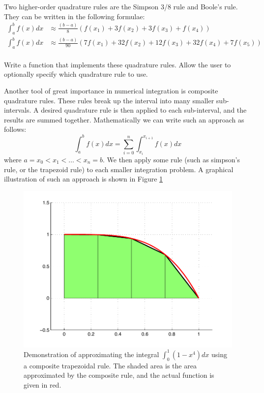 \begin{problem}
Two higher-order quadrature rules are the Simpson 3/8 rule and Boole's rule. They can be written in the following formulae:
\begin{align*}
\int_a^b f(x) dx &\approx \frac{(b-a)}{8}\left(f(x_1) + 3 f(x_2) + 3 f(x_3) + f(x_4)\right) \\
\int_a^b f(x) dx &\approx \frac{(b-a)}{90}\left(7f(x_1) + 32 f(x_2) + 12 f(x_3) + 32f(x_4) + 7 f(x_5)\right) \\
\end{align*}

Write a function that implements these quadrature rules. Allow the user to optionally specify which quadrature rule to use.
\end{problem}

Another tool of great importance in numerical integration is composite quadrature rules. These rules break up the interval into many smaller sub-intervals. A desired quadrature rule is then applied to each sub-interval, and the results are summed together. Mathematically we can write such an approach as follows:
\[
\int_a^b f(x) dx = \sum_{i=0}^n \int_{x_i}^{x_{i+1}} f(x) dx
\]
where $a = x_0 < x_1 < \ldots < x_n = b$. We then apply some rule (such as simpson's rule, or the trapezoid rule) to each smaller integration problem. A graphical illustration of such an approach is shown in Figure \ref{Fig:TrapezoidalComposite}

\begin{figure}
\begin{center}
\includegraphics[scale=.4]{./FiguresMAT/TrapezoidComp.pdf}
\caption{Demonstration of approximating the integral $\int_0^1 (1-x^4)dx$ using a composite trapezoidal rule. The shaded area is the area approximated by the composite rule, and the actual function is given in red.}
\label{Fig:TrapezoidalComposite}
\end{center}
\end{figure}

